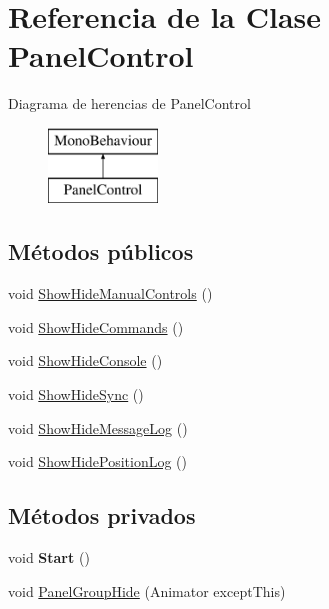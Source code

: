 \hypertarget{class_panel_control}{}\section{Referencia de la Clase Panel\+Control}
\label{class_panel_control}
Diagrama de herencias de Panel\+Control\begin{figure}[H]
\begin{center}
\leavevmode
\includegraphics[height=2.000000cm]{class_panel_control}
\end{center}
\end{figure}
\subsection*{Métodos públicos}
\begin{DoxyCompactItemize}
\item 
void \mbox{\hyperlink{class_panel_control_a1507903dbb7f0b7f49cb74b4b77247b2}{Show\+Hide\+Manual\+Controls}} ()
\item 
void \mbox{\hyperlink{class_panel_control_ad1245999af785ac0aa3af3f1a6f40900}{Show\+Hide\+Commands}} ()
\item 
void \mbox{\hyperlink{class_panel_control_a2890c74bb81afa4e93e6d698ae5f5721}{Show\+Hide\+Console}} ()
\item 
void \mbox{\hyperlink{class_panel_control_a745d60a4ef5ace7f7691418081db8f94}{Show\+Hide\+Sync}} ()
\item 
void \mbox{\hyperlink{class_panel_control_abd20147e23935b9f87a0b4508a2078c6}{Show\+Hide\+Message\+Log}} ()
\item 
void \mbox{\hyperlink{class_panel_control_a5a25252b29b3ba097cc79778c42c469a}{Show\+Hide\+Position\+Log}} ()
\end{DoxyCompactItemize}
\subsection*{Métodos privados}
\begin{DoxyCompactItemize}
\item 
\mbox{\label{class_panel_control_a6fb7e28ad845a0c03653637a123fd174}} 
void {\bfseries Start} ()
\item 
void \mbox{\hyperlink{class_panel_control_a89ad407cadb68b103021f66db72c8716}{Panel\+Group\+Hide}} (Animator except\+This)
\end{DoxyCompactItemize}
